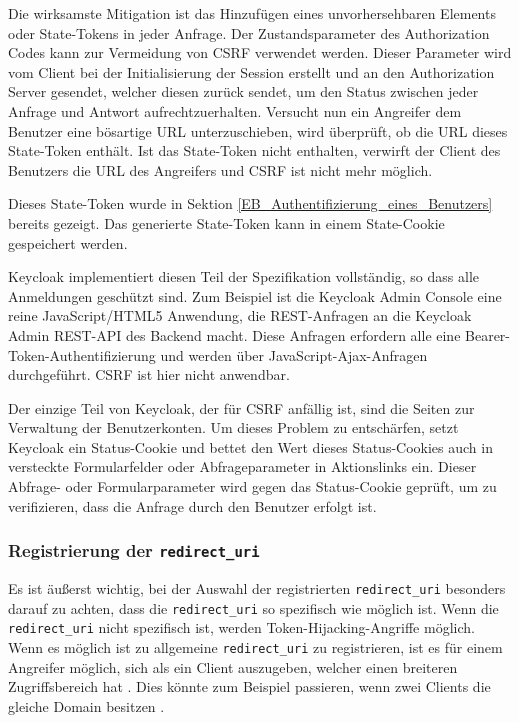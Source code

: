 Die wirksamste Mitigation ist das Hinzufügen eines unvorhersehbaren Elements oder State-Tokens in jeder Anfrage. Der Zustandsparameter des Authorization Codes kann zur Vermeidung von CSRF verwendet werden. Dieser Parameter wird vom Client bei der Initialisierung der Session erstellt und an den Authorization Server gesendet, welcher diesen zurück sendet, um den Status zwischen jeder Anfrage und Antwort aufrechtzuerhalten. Versucht nun ein Angreifer dem Benutzer eine bösartige URL unterzuschieben, wird überprüft, ob die URL dieses State-Token enthält. Ist das State-Token nicht enthalten, verwirft der Client des Benutzers die URL des Angreifers und CSRF ist nicht mehr möglich. \cite{SSEB_OAuth2inAction}

Dieses State-Token wurde in Sektion \ref{EB_Authentifizierung_eines_Benutzers} bereits gezeigt. Das generierte State-Token kann in einem State-Cookie gespeichert werden.

Keycloak implementiert diesen Teil der Spezifikation vollständig, so dass alle Anmeldungen geschützt sind. Zum Beispiel ist die Keycloak Admin Console eine reine JavaScript/HTML5 Anwendung, die REST-Anfragen an die Keycloak Admin REST-API des Backend macht. Diese Anfragen erfordern alle eine Bearer-Token-Authentifizierung und werden über JavaScript-Ajax-Anfragen durchgeführt. CSRF ist hier nicht anwendbar. \cite{SSEB_keycloakDocs}

Der einzige Teil von Keycloak, der für CSRF anfällig ist, sind die Seiten zur Verwaltung der Benutzerkonten. Um dieses Problem zu entschärfen, setzt Keycloak ein Status-Cookie und bettet den Wert dieses Status-Cookies auch in versteckte Formularfelder oder Abfrageparameter in Aktionslinks ein. Dieser Abfrage- oder Formularparameter wird gegen das Status-Cookie geprüft, um zu verifizieren, dass die Anfrage durch den Benutzer erfolgt ist. \cite{SSEB_keycloakDocs}

\subsubsection{Registrierung der \texttt{redirect\_uri}}\label{Registrierung_redirect_uri}

Es ist äußerst wichtig, bei der Auswahl der registrierten \texttt{redirect\_uri} besonders darauf zu achten, dass die \texttt{redirect\_uri} so spezifisch wie möglich ist. Wenn die \texttt{redirect\_uri} nicht spezifisch ist, werden Token-Hijacking-Angriffe möglich. Wenn es möglich ist zu allgemeine \texttt{redirect\_uri} zu registrieren, ist es für einem Angreifer möglich, sich als ein Client auszugeben, welcher einen breiteren Zugriffsbereich hat \cite{SSEB_keycloakDocs}. Dies könnte zum Beispiel passieren, wenn zwei Clients die gleiche Domain besitzen \cite{SSEB_keycloakDocs}.


